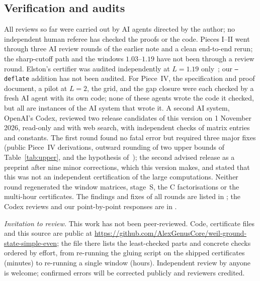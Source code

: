 \documentclass[11pt]{amsart}
\newcommand{\file}[1]{{\small\path{#1}}}
\theoremstyle{definition}
\theoremstyle{remark}
\numberwithin{equation}{section}
\begin{document}
\subsection{Verification and audits}\label{sec:audits}
All reviews so far were carried out by AI agents directed by the author; no independent human referee has checked the proofs or the code. Pieces I--II went through three AI review rounds of the earlier note and a clean end-to-end rerun; the sharp-cutoff path and the windows $1.03$--$1.19$ have not been through a review round. Elston's certifier was audited independently at $L=1.19$ only~\cite{Elston}; our \texttt{--deflate} addition has not been audited. For Piece~IV, the specification and proof document, a pilot at $L=2$, the grid, and the gap closure were each checked by a fresh AI agent with its own code; none of these agents wrote the code it checked, but all are instances of the AI system that wrote it. A second AI system, OpenAI's Codex, reviewed two release candidates of this version on 1 November 2026, read-only and with web search, with independent checks of matrix entries and constants. The first round found no fatal error but required three major fixes (public Piece~IV derivations, outward rounding of two upper bounds of Table~\ref{tab:upper}, and the hypothesis of~\cite[Thm.~6.1]{CvS}); the second advised release as a preprint after nine minor corrections, which this version makes, and stated that this was not an independent certification of the large computations. Neither round regenerated the window matrices, stage~S, the C factorisations or the multi-hour certificates. The findings and fixes of all rounds are listed in \file{supplement/AUDITS.md}; the Codex reviews and our point-by-point responses are in \file{reviews/}.
\begin{sloppypar}\emph{Invitation to review.} This work has not been peer-reviewed. Code, certificate files and this source are public at \url{https://github.com/AlexGenusCore/weil-ground-state-simple-even}; the file \file{REVIEWING.md} there lists the least-checked parts and concrete checks ordered by effort, from re-running the gluing script on the shipped certificates (minutes) to re-running a single window (hours). Independent review by anyone is welcome; confirmed errors will be corrected publicly and reviewers credited.\end{sloppypar}

\end{document}
